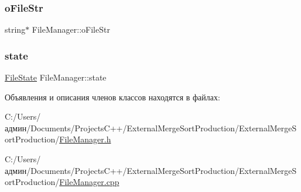 \hypertarget{class_file_manager_adf10708d6e8e3b4d329077af4666e147}{}\label{class_file_manager_adf10708d6e8e3b4d329077af4666e147} 
\subsubsection{\texorpdfstring{o\+File\+Str}{oFileStr}}
{\footnotesize\ttfamily string$\ast$ File\+Manager\+::o\+File\+Str\hspace{0.3cm}{\ttfamily [private]}}

\hypertarget{class_file_manager_a84bbcd4e3807e076ecdbd0e5dfbefa5f}{}\label{class_file_manager_a84bbcd4e3807e076ecdbd0e5dfbefa5f} 
\subsubsection{\texorpdfstring{state}{state}}
{\footnotesize\ttfamily \hyperlink{_structures_8h_a57306ae0f9e356347388234ed69e0ce7}{File\+State} File\+Manager\+::state\hspace{0.3cm}{\ttfamily [private]}}



Объявления и описания членов классов находятся в файлах\+:\begin{DoxyCompactItemize}
\item 
C\+:/\+Users/админ/\+Documents/\+Projects\+C++/\+External\+Merge\+Sort\+Production/\+External\+Merge\+Sort\+Production/\hyperlink{_file_manager_8h}{File\+Manager.\+h}\item 
C\+:/\+Users/админ/\+Documents/\+Projects\+C++/\+External\+Merge\+Sort\+Production/\+External\+Merge\+Sort\+Production/\hyperlink{_file_manager_8cpp}{File\+Manager.\+cpp}\end{DoxyCompactItemize}
